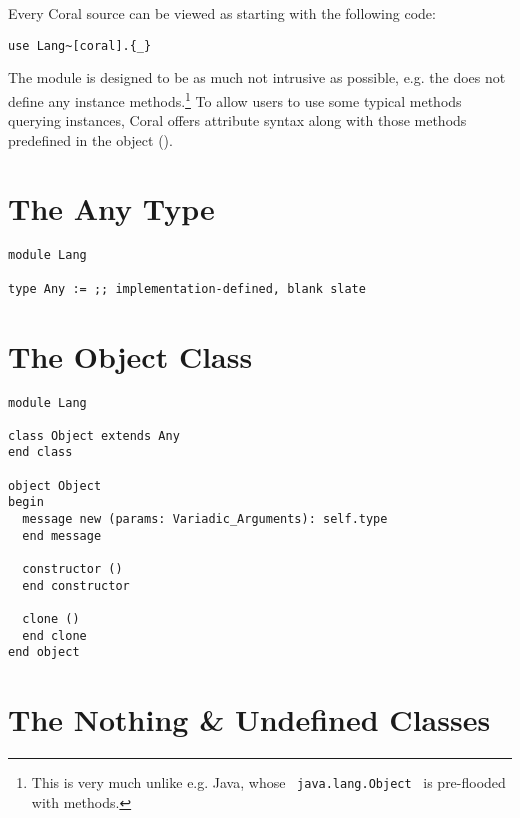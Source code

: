 Every Coral source can be viewed as starting with the following code:
\begin{lstlisting}
use Lang~[coral].{_}
\end{lstlisting}

The  module is designed to be as much not intrusive as possible, e.g. the  does not define any instance methods.\footnote{This is very much unlike e.g. Java, whose ~\lstinline!java.lang.Object!~ is pre-flooded with methods.} To allow users to use some typical methods querying  instances, Coral offers attribute syntax along with those methods predefined in the  object (). 




\section{The Any Type}
\label{sec:lang-any}

\begin{lstlisting}
module Lang

type Any := ;; implementation-defined, blank slate
\end{lstlisting}






\section{The Object Class}
\label{sec:lang-object}

\begin{lstlisting}
module Lang

class Object extends Any 
end class

object Object
begin
  message new (params: Variadic_Arguments): self.type 
  end message
  
  constructor ()
  end constructor
  
  clone ()
  end clone
end object
\end{lstlisting}






\section{The Nothing \& Undefined Classes}
\label{sec:lang-nothing}
\label{sec:lang-undefined}

